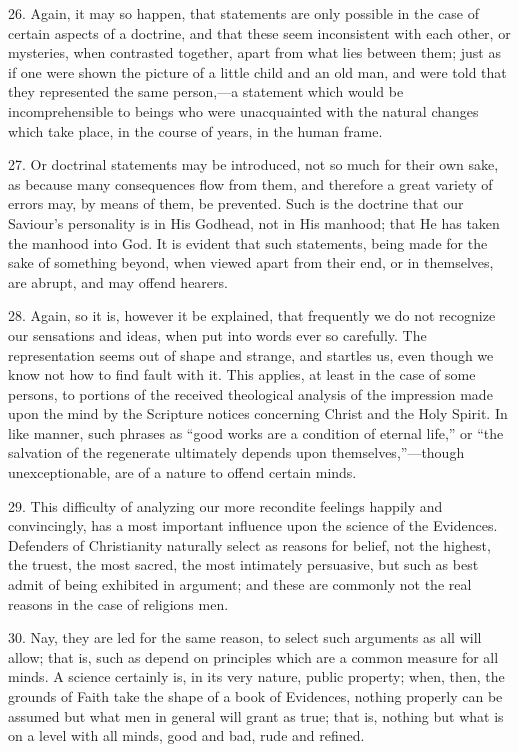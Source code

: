 26. Again, it may so happen, that statements are only possible in
the case of certain aspects of a doctrine, and that these seem
inconsistent with each other, or mysteries, when contrasted together,
apart from what lies between them; just as if one were shown the
picture of a little child and an old man, and were told that they
represented the same person,—a statement which would be
incomprehensible to beings who were unacquainted with the natural
changes which take place, in the course of years, in the human frame.

27. Or doctrinal statements may be introduced, not so much for
their own sake, as because many consequences flow from them, and
therefore a great variety of errors may, by means of them, be
prevented. Such is the doctrine that our Saviour's personality is in
His Godhead, not in His manhood; that He has taken the manhood into
God. It is evident that such statements, being made for the sake of
something beyond, when viewed apart from their end, or in themselves,
are abrupt, and may offend hearers.

28. Again, so it is, however it be explained, that frequently we do
not recognize our sensations and ideas, when put into words ever so
carefully. The representation seems out of shape and strange, and
startles us, even though we know not how to find fault with it. This
applies, at least in the case of some persons, to portions of the
received theological analysis of the impression made upon the mind by
the Scripture notices concerning Christ and the Holy Spirit. In like
manner, such phrases as ``good works are a condition of eternal
life,'' or ``the salvation of the regenerate ultimately depends upon themselves,''—though unexceptionable, are of a
nature to offend certain minds.

29. This difficulty of analyzing our more recondite feelings
happily and convincingly, has a most important influence upon the
science of the Evidences. Defenders of Christianity naturally select
as reasons for belief, not the highest, the truest, the most sacred,
the most intimately persuasive, but such as best admit of being
exhibited in argument; and these are commonly not the real reasons in
the case of religions men.

30. Nay, they are led for the same reason, to select such arguments
as all will allow; that is, such as depend on principles which are a
common measure for all minds. A science certainly is, in its very
nature, public property; when, then, the grounds of Faith take the
shape of a book of Evidences, nothing properly can be assumed but what
men in general will grant as true; that is, nothing but what is on a
level with all minds, good and bad, rude and refined.

